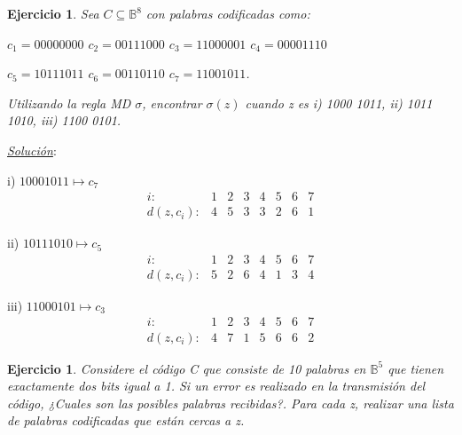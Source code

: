 \documentclass{beamer}
\theoremstyle{plain}
\theoremstyle{example}
\newtheorem{ejercicio} [Ejercicio]{Ejercicio}
\theoremstyle{example}
\begin{document}
\begin{frame}  \small 
\begin{ejercicio} 

Sea $C \subseteq \mathbb{B}^8$ con palabras codificadas como:

\begin{center}
 $c_1 =0000 0000$ $c_2 =0011 1000$ $c_3 =1100 0001$ $c_4 =0000 1110$
\end{center}
\begin{center}
$c_5 = 1011 1011$	$c_6 = 0011 0110$	$c_7 = 1100 1011$. 
\end{center}

Utilizando la regla MD $\sigma$, encontrar $\sigma(z)$ cuando z es i) 1000 1011,	ii) 1011 1010,	iii) 1100 0101.

\end{ejercicio}

\end{frame} 
\begin{frame}  \small 

\textit{\underline{Solución}}:\\
\vspace{0.3cm}

i) $1000 1011 \mapsto c_7$
\[
 \begin{array}{lccccccc}
               i:  & 1  & 2  & 3 & 4  & 5  & 6 & 7 \\
        d(z,c_i): & 4  & 5  & 3 & 3  & 2  & 6 & 1 
           \end{array}
           \]

ii) $1011 1010 \mapsto c_5$
\[
 \begin{array}{lccccccc}
               i:  & 1  & 2  & 3 & 4  & 5  & 6 & 7 \\
        d(z,c_i): & 5  & 2 & 6 & 4  & 1  & 3 & 4 
           \end{array}
           \]

iii) $1100 0101 \mapsto c_3$
\[
 \begin{array}{lccccccc}
               i:  & 1  & 2  & 3 & 4  & 5  & 6 & 7 \\
        d(z,c_i): & 4  & 7  & 1 & 5  & 6  & 6 & 2 
           \end{array}
           \]
\end{frame} 

\begin{frame}  \small 
\begin{ejercicio} 

Considere el código C 	que consiste de 10 palabras en $\mathbb{B}^5$ que tienen exactamente  dos bits igual a 1. Si un error es realizado en la transmisión del código, 
\vspace{0.1cm}
¿Cuales son las posibles palabras recibidas?. 
\vspace{0.1cm}
Para cada z, realizar una lista de palabras codificadas que están cercas a z.

\end{ejercicio}

\end{frame} 
\end{document}
